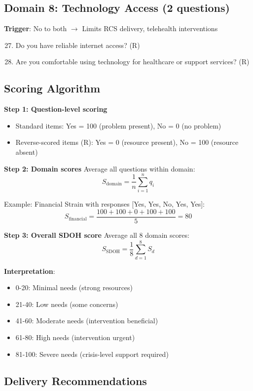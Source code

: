 \documentclass{article}
\begin{document}
\subsection*{Domain 8: Technology Access (2 questions)}
\textbf{Trigger}: No to both $\rightarrow$ Limits RCS delivery, telehealth interventions

\begin{enumerate}
    \setcounter{enumi}{26}
    \item Do you have reliable internet access? (R)
    \item Are you comfortable using technology for healthcare or support services? (R)
\end{enumerate}

\subsection*{Scoring Algorithm}

\textbf{Step 1: Question-level scoring}
\begin{itemize}
    \item Standard items: Yes = 100 (problem present), No = 0 (no problem)
    \item Reverse-scored items (R): Yes = 0 (resource present), No = 100 (resource absent)
\end{itemize}

\textbf{Step 2: Domain scores}  
Average all questions within domain:
$$S_{\text{domain}} = \frac{1}{n} \sum_{i=1}^{n} q_i$$

Example: Financial Strain with responses [Yes, Yes, No, Yes, Yes]:
$$S_{\text{financial}} = \frac{100 + 100 + 0 + 100 + 100}{5} = 80$$

\textbf{Step 3: Overall SDOH score}  
Average all 8 domain scores:
$$S_{\text{SDOH}} = \frac{1}{8} \sum_{d=1}^{8} S_{d}$$

\textbf{Interpretation}:
\begin{itemize}
    \item 0-20: Minimal needs (strong resources)
    \item 21-40: Low needs (some concerns)
    \item 41-60: Moderate needs (intervention beneficial)
    \item 61-80: High needs (intervention urgent)
    \item 81-100: Severe needs (crisis-level support required)
\end{itemize}

\subsection*{Delivery Recommendations}
\end{document}
